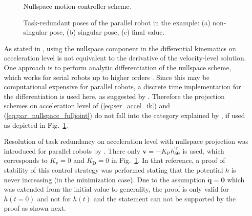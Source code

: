 \documentclass[a4paper,twoside]{article}
\newcommand{\transp}[0]{{\mathrm{T}}}
\begin{document}
\begin{figure}[tb]
	
	\caption{Nullspace motion controller scheme.}
	\label{fig:control_loop}
\end{figure}


\begin{figure}[tb] %
	
	\caption{Task-redundant poses of the parallel robot in the example: (a) non-singular pose, (b) singular pose, (c) final value.}
	\label{fig:pkm_poses}
\end{figure}

As stated in \cite{ReiterMueGat2018}, using the nullspace component in the differential kinematics on acceleration level is not equivalent to the derivative of the velocity-level solution.
One approach is to perform analytic differentiation of the nullspace scheme, which works for serial robots up to higher orders \cite{ReiterMueGat2018}.
Since this may be computational expensive for parallel robots, a discrete time implementation for the differentiation is used here, as suggested by \cite{DeLucaOriSic1992}.
Therefore the projection schemes on acceleration level of (\ref{eq:ser_accel_ik}) and (\ref{eq:par_nullspace_fulljoint}) do not fall into the category explained by \cite{ReiterMueGat2018}, if used as depicted in Fig.~\ref{fig:control_loop}.

Resolution of task redundancy on acceleration level with nullspace projection was introduced for parallel robots by \cite{AgarwalNasBan2016}.
There only $\bm{v}{=}{-}K_\mathrm{P} h_{\partial \bm{\theta}}^\transp$ is used, which corresponds to $K_\mathrm{v}{=}0$ and $K_\mathrm{D}{=}0$ in Fig.~\ref{fig:control_loop}.
In that reference, a proof of stability of this control strategy was performed stating that the potential $h$ is never increasing (in the minimization case).
Due to the assumption $\dot{\bm{q}}{=}\bm{0}$ which was extended from the initial value to generality, the proof is only valid for $h(t=0)$ and not for $h(t)$ and the statement can not be supported by the proof as shown next.

%
\end{document}
